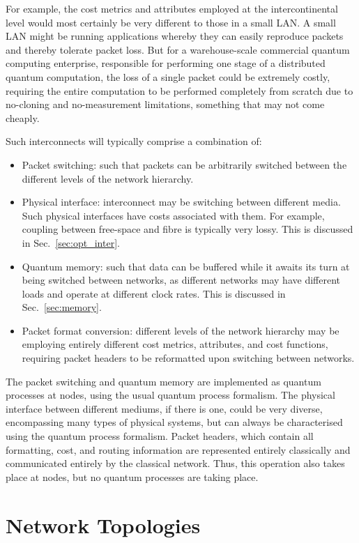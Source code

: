 \documentclass[aps,rmp,twocolumn,amsmath,amssymb,nofootinbib,superscriptaddress]{revtex4}
\begin{document}
For example, the cost metrics and attributes employed at the intercontinental level would most certainly be very different to those in a small LAN. A small LAN might be running applications whereby they can easily reproduce packets and thereby tolerate packet loss. But for a warehouse-scale commercial quantum computing enterprise, responsible for performing one stage of a distributed quantum computation, the loss of a single packet could be extremely costly, requiring the entire computation to be performed completely from scratch due to no-cloning and no-measurement limitations, something that may not come cheaply.

Such interconnects will typically comprise a combination of:
\begin{itemize}
\item Packet switching: such that packets can be arbitrarily switched between the different levels of the network hierarchy.
\item Physical interface: interconnect may be switching between different media. Such physical interfaces have costs associated with them. For example, coupling between free-space and fibre is typically very lossy. This is discussed in Sec.~\ref{sec:opt_inter}.
\item Quantum memory: such that data can be buffered while it awaits its turn at being switched between networks, as different networks may have different loads and operate at different clock rates. This is discussed in Sec.~\ref{sec:memory}.
\item Packet format conversion: different levels of the network hierarchy may be employing entirely different cost metrics, attributes, and cost functions, requiring packet headers to be reformatted upon switching between networks.
\end{itemize}

The packet switching and quantum memory are implemented as quantum processes at nodes, using the usual quantum process formalism. The physical interface between different mediums, if there is one, could be very diverse, encompassing many types of physical systems, but can always be characterised using the quantum process formalism. Packet headers, which contain all formatting, cost, and routing information are represented entirely classically and communicated entirely by the classical network. Thus, this operation also takes place at nodes, but no quantum processes are taking place.

%
%

\section{Network Topologies}
\end{document}

